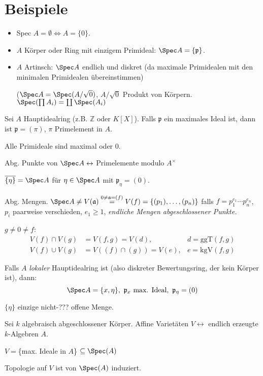 \section{Beispiele}
\begin{itemize}
\item Spec $A=\emptyset\Leftrightarrow A=\{0\}$.
\item $A$ Körper oder Ring mit einzigem Primideal: $\Spec
  A=\{\mathfrak{p}\}$.
\item $A$ Artinsch: $\Spec A$ endlich und diskret (da maximale
  Primidealen mit den minimalen Primidealen übereinstimmen)

  ($\Spec A=\Spec(A/\sqrt{0})$, $A/\sqrt{0}$ Produkt von Körpern.
  $\Spec(\prod A_{i})=\coprod\Spec(A_{i})$
\end{itemize}

\begin{example}
  Sei $A$ Hauptidealring (z.B. $\mathbb{Z}$ oder $K[X]$). Falls
  $\mathfrak{p}$ ein maximales Ideal ist, dann ist
  $\mathfrak{p}=(\pi)$, $\pi$ Primelement in $A$.

  Alle Primideale sind maximal oder 0.

  Abg. Punkte von $\Spec A\leftrightarrow$ Primelemente modulo $A^{\times}$

  $\overline{\{\eta\}}=\Spec A$ für $\eta\in\Spec A$ mit $\mathfrak{p}_{\eta}=(0)$.

  Abg. Mengen. $\Spec A\neq
  V(\mathfrak{a})\overset{0\neq\mathfrak{a}=(f)}{=}V(f)=\{(p_{1}),\ldots,(p_{n})\}$
  falls $f=p_{1}^{e_{1}}\cdots p_{n}^{e_{n}}$, $p_{i}$ paarweise
  verschieden, $e_{1}\geq1$, \emph{endliche Mengen abgeschlossener Punkte.}

  $g\neq0\neq f$:
  \begin{align*}
    V(f)\cap V(g) & =V(f,g)=V(d), & d=\text{ggT}(f,g)\\
    V(f)\cup V(g) & =V((f)\cap(g))=V(e), & e=\text{kgV}(f,g)
  \end{align*}

  Falls $A$ \emph{lokaler} Hauptidealring ist (also diskreter
  Bewertungsring, der kein Körper ist), dann:
  \[
    \Spec A=\{x,\eta\},\ \mathfrak{p}_{x}\text{ max. Ideal},\
    \mathfrak{p}_{\eta}=(0)
  \]

  $\{\eta\}$ einzige nicht-???  offene Menge.
\end{example}
 
\begin{example}
  Sei $k$ algebraisch abgeschlossener Körper. Affine Varietäten
  $V\leftrightarrow$ endlich erzeugte $k$-Algebren $A$.

  $V=$\{max. Ideale in $A$\} $\subseteq\Spec(A)$

  Topologie auf $V$ ist von $\Spec(A)$ induziert.
\end{example}
 
